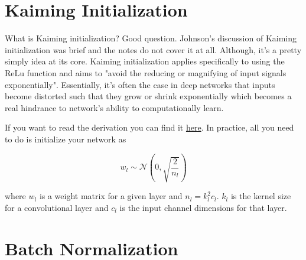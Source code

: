 \documentclass[12pt]{article}
\begin{document}
\section{Kaiming Initialization}
What is Kaiming initialization? Good question. Johnson's discussion of Kaiming initialization was 
brief and the notes do not cover it at all. Although, it's a pretty simply idea at its core. 
Kaiming initialization applies specifically to using the ReLu function and aims to "avoid the 
reducing or magnifying of input signals exponentially". Essentially, it's often the case 
in deep networks that inputs become distorted such that they grow or shrink exponentially 
which becomes a real hindrance to network's ability to computationally learn. 

If you want to read the derivation you can find it \href{https://arxiv.org/abs/1502.01852v1}{here}. 
In practice, all you need to do is initialize your network as

\begin{equation}
    w_l \sim \mathcal{N}(0, \sqrt{ \frac{2}{n_l} })
\end{equation}

\noindent where $w_l$ is a weight matrix for a given layer and $n_l = k_l^2 c_l$. $k_l$ is the kernel 
size for a convolutional layer and $c_l$ is the input channel dimensions for that layer. 


\section{Batch Normalization}
\end{document}
